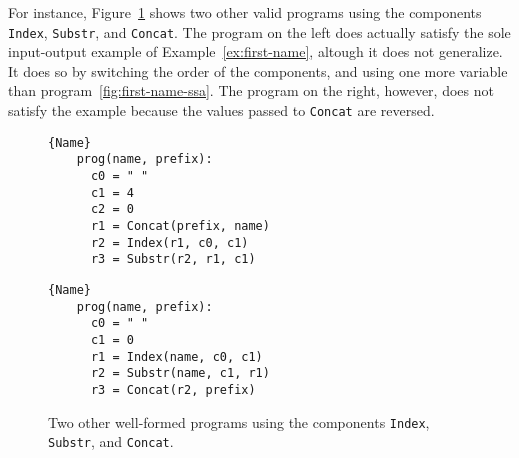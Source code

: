 For instance, Figure~\ref{fig:other-valid-programs} shows two other valid
programs using the components \lstinline{Index}, \lstinline{Substr}, and
\lstinline{Concat}. The program on the left does actually satisfy the sole
input-output example of Example~\ref{ex:first-name}, altough it does not
generalize. It does so by switching the order of the components, and using one
more variable than program~\ref{fig:first-name-ssa}. The program on the right,
however, does not satisfy the example because the values passed to
\lstinline{Concat} are reversed.

\begin{figure}
\noindent
\begin{minipage}{.45\textwidth}
  \begin{lstlisting}[frame=tlrb]{Name}
    prog(name, prefix):
      c0 = " "
      c1 = 4
      c2 = 0
      r1 = Concat(prefix, name)
      r2 = Index(r1, c0, c1)
      r3 = Substr(r2, r1, c1)
  \end{lstlisting}
\end{minipage}\hfill
\begin{minipage}{.45\textwidth}
  \begin{lstlisting}[frame=tlrb]{Name}
    prog(name, prefix):
      c0 = " "
      c1 = 0
      r1 = Index(name, c0, c1)
      r2 = Substr(name, c1, r1)
      r3 = Concat(r2, prefix)
\end{lstlisting}
\end{minipage}
\caption{Two other well-formed programs using the components \lstinline{Index},
  \lstinline{Substr}, and \lstinline{Concat}.}
\label{fig:other-valid-programs}
\end{figure}

